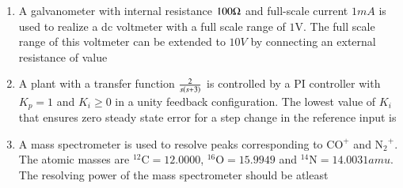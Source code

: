 \documentclass[journal,12pt,onecolumn]{IEEEtran}
\theoremstyle{remark}
\begin{document}
\begin{enumerate}
 
\item A galvanometer with internal resistance $100\ohm$ and full-scale current $1mA$ is used to realize a dc voltmeter with a full scale range of $1\text{V}$. The full scale range of this voltmeter can be extended to $10V$ by connecting an external resistance of value \par \hfill{}
\begin{enumerate}
\end{enumerate}

 
\item A plant with a transfer function $\frac{2}{s\left(s+3\right)}$ is controlled by a PI controller with $K_p=1$ and $K_i\ge0$ in a unity feedback configuration. The lowest value of $K_i$ that ensures zero steady state error for a step change in the reference input is \par \hfill{}
\begin{enumerate}
\end{enumerate}

 
\item A mass spectrometer is used to resolve peaks corresponding to $\mathrm{CO^{+}}$ and $\mathrm{N_2}^+$. The atomic masses are $^{12}\mathrm{C}=12.0000$, $^{16}\mathrm{O}=15.9949$ and $^{14}\mathrm{N}=14.0031 amu$. The resolving power of the mass spectrometer should be atleast \par \hfill{}
\begin{enumerate}
\end{enumerate}


\end{enumerate}
\end{document}
